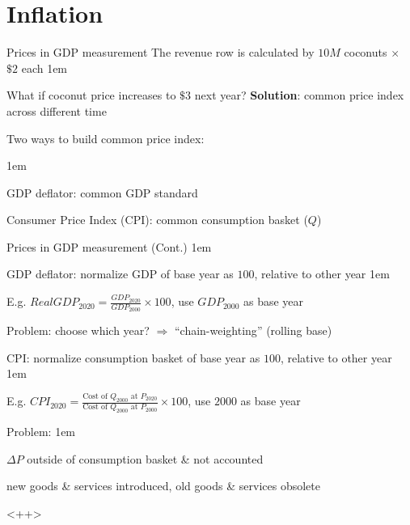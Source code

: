 \documentclass[11pt,aspectratio=43]{beamer}
\let\olditemize=\itemize
\let\endolditemize=\enditemize
\renewenvironment{itemize}{\olditemize \itemsep1em}{\endolditemize}
\let\oldenumerate=\enumerate
\let\endoldenumerate=\endenumerate
\renewenvironment{enumerate}{\oldenumerate \itemsep1em}{ \endoldenumerate}
\theoremstyle{definition}
\begin{document}
\section{Inflation}
\label{sec:Inflation}

\begin{frame}{Prices in GDP measurement}
\label{slide:Prices_in_GDP_measurement}
    The \alert{revenue} row is calculated by $ 10M $ coconuts $ \times $ $ \$2 $ each
    \begin{itemize}
        \item What if coconut price increases to $ \$3 $ next year?
    \end{itemize}
    \textbf{Solution}: common \alert{price index} across different time

    Two ways to build common price index:

    \begin{enumerate}
        \item GDP deflator: common \alert{GDP} standard
        \item Consumer Price Index (CPI): common \alert{consumption basket} ($Q$)
    \end{enumerate}
\end{frame}

\begin{frame}{Prices in GDP measurement (Cont.)}
\label{slide:Prices_in_GDP_measurement__Cont__}
    \begin{itemize}
        \item GDP deflator: normalize \alert{GDP} of \alert{base year} as $ 100 $, relative to \alert{other year}
        \begin{itemize}
            \item E.g. $ RealGDP_{2020} = \frac{GDP_{2020}}{GDP_{2000}} \times 100 $, use $ GDP_{2000} $ as base year
            \item \alert{Problem}: choose which year? $ \Rightarrow  $ ``\alert{chain-weighting}'' (rolling base)
        \end{itemize}
        \item CPI: normalize \alert{consumption basket} of \alert{base year} as $ 100 $, relative to \alert{other year}
        \begin{itemize}
            \item E.g. $ CPI_{2020} = \frac{\text{Cost of } Q_{2000} \text{ at } P_{2020}}{\text{Cost of } Q_{2000} \text{ at } P_{2000}} \times 100 $, use $ 2000 $ as base year
            \item \alert{Problem}:
            \begin{enumerate}
                \item $ \Delta P $ outside of consumption basket \&  not accounted
                \item new goods \& services introduced, old goods \& services obsolete
            \end{enumerate}
        \end{itemize}
    \end{itemize}
\end{frame}
<++>
\end{document}
